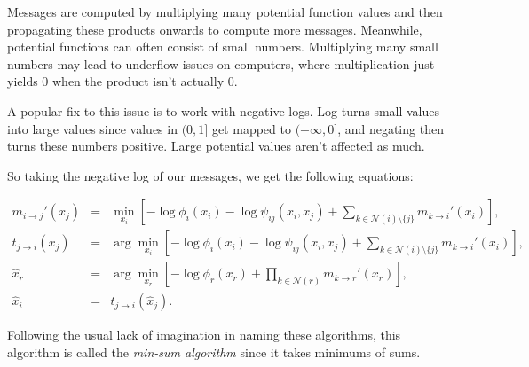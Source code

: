 \documentclass[6008notes.tex]{subfiles}
\begin{document}
Messages are computed by multiplying many potential function values and then propagating these products onwards to compute more messages. Meanwhile, potential functions can often consist of small numbers. Multiplying many small numbers may lead to underflow issues on computers, where multiplication just yields 0 when the product isn't actually 0.

A popular fix to this issue is to work with negative logs. Log turns small values into large values since values in $(0,1]$ get mapped to $(-\infty,0]$, and negating then turns these numbers positive. Large potential values aren't affected as much.

So taking the negative log of our messages, we get the following equations:

\begin{eqnarray*}
m_{i \to j}'(x_j)
&=& \min_{x_i}
      \left[
        -\log\phi_i(x_i) - \log\psi_{ij}(x_i,x_j) +
        \sum_{k \in \mathcal{N}(i) \setminus \{j\}} m_{k \to i}'(x_i)
      \right], \\
t_{j \to i}(x_j)
&=& \arg\min_{x_i}
      \left[
        -\log\phi_i(x_i) - \log\psi_{ij}(x_i,x_j) +
        \sum_{k \in \mathcal{N}(i) \setminus \{j\}} m_{k \to i}'(x_i)
      \right], \\
\hat{x}_r
&=& \arg\min_{x_r}
      \left[
        -\log\phi_r(x_r) +
        \prod_{k \in \mathcal{N}(r)} m_{k \to r}'(x_r)
      \right], \\
\hat{x}_i
&=& t_{j \to i}(\hat{x}_j).
\end{eqnarray*}

Following the usual lack of imagination in naming these algorithms, this algorithm is called the \textit{min-sum algorithm} since it takes minimums of sums.
\end{document}
